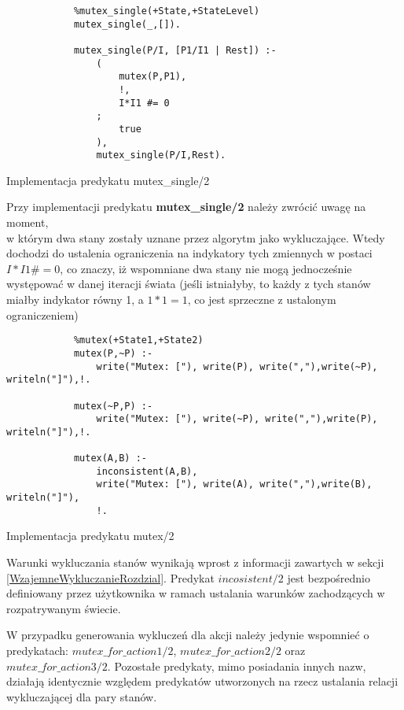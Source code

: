     \begin{listing}[H]
        \begin{verbatim}
            %mutex_single(+State,+StateLevel)
            mutex_single(_,[]).

            mutex_single(P/I, [P1/I1 | Rest]) :-
                ( 
                    mutex(P,P1), 
                    !, 
                    I*I1 #= 0
                ;
                    true
                ),
                mutex_single(P/I,Rest).
    \end{verbatim}
    \caption{Implementacja predykatu mutex\_single/2}
    \end{listing}

    Przy implementacji predykatu \textbf{mutex\_single/2} należy zwrócić uwagę na moment, \\
    w którym dwa stany zostały uznane przez algorytm jako
    wykluczające. Wtedy dochodzi do ustalenia ograniczenia na indykatory tych zmiennych w postaci $I*I1 \#= 0$, co znaczy, iż wspomniane dwa 
    stany nie mogą jednocześnie występować w danej iteracji świata (jeśli istniałyby, to każdy z tych stanów miałby indykator równy 1, a $1*1=1$, 
    co jest sprzeczne z ustalonym ograniczeniem)

    \begin{listing}[H]
        \begin{verbatim}
            %mutex(+State1,+State2)
            mutex(P,~P) :-
                write("Mutex: ["), write(P), write(","),write(~P), writeln("]"),!.
        
            mutex(~P,P) :-
                write("Mutex: ["), write(~P), write(","),write(P), writeln("]"),!.  
            
            mutex(A,B) :-              
                inconsistent(A,B),
                write("Mutex: ["), write(A), write(","),write(B), writeln("]"), 
                !.
    \end{verbatim}
    \caption{Implementacja predykatu mutex/2}
    \end{listing}

    Warunki wykluczania stanów wynikają wprost z informacji zawartych w sekcji \ref{WzajemneWykluczanieRozdzial}. Predykat $incosistent/2$ jest bezpośrednio definiowany przez 
    użytkownika w ramach ustalania warunków zachodzących w rozpatrywanym świecie.

    W przypadku generowania wykluczeń dla akcji należy jedynie wspomnieć o predykatach: $mutex\_for\_action1/2$, $mutex\_for\_action2/2$ oraz $mutex\_for\_action3/2$.
    Pozostałe predykaty, mimo posiadania innych nazw, działają identycznie względem predykatów utworzonych na rzecz ustalania relacji wykluczającej dla 
    pary stanów.

